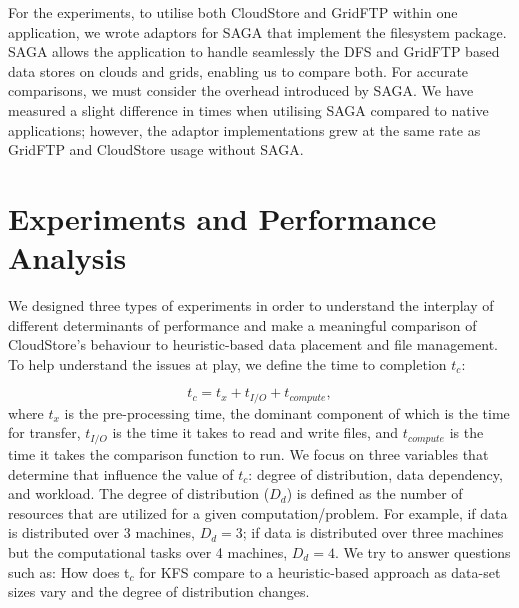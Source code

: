 \documentclass{rspublic}
\begin{document}
For the experiments, to utilise both CloudStore and GridFTP within one
application, we wrote adaptors for SAGA that implement the filesystem
package. SAGA allows the application to handle seamlessly the DFS and
GridFTP based data stores on clouds and grids, enabling us to compare
both. For accurate comparisons, we must consider the overhead
introduced by SAGA. We have measured a slight difference in times when
utilising SAGA compared to native applications; however, the adaptor
implementations grew at the same rate as GridFTP and CloudStore usage
without SAGA. 


\vspace{-0.5cm}

\section{Experiments and Performance Analysis} 


We designed three types of experiments in order to understand the
interplay of different determinants of performance and make a
meaningful comparison of CloudStore's behaviour to heuristic-based
data placement and file management. To help understand the issues at
play, we define the time to completion $t_c$:

\vspace{-0.3cm}

 \begin{equation}
t_c = t_x + t_{I/O} + t_{compute},
\end{equation}
where $t_x$ is the pre-processing time, the dominant component of
which is the time for transfer, $t_{I/O}$ is the time it takes to read
and write files, and $t_{compute}$ is the time it takes the comparison
function to run. We focus on three variables that determine that
influence the value of $t_c$: degree of distribution, data dependency,
and workload. The degree of distribution ($D_d$) is defined as the
number of resources that are utilized for a given
computation/problem. For example, if data is distributed over 3
machines, $D_d=3$; if data is distributed over three machines but the
computational tasks over 4 machines, $D_d=4$. We try to answer
questions such as: How does t$_c$ for KFS compare to a heuristic-based
approach as data-set sizes vary and the degree of distribution
changes.
\end{document}
